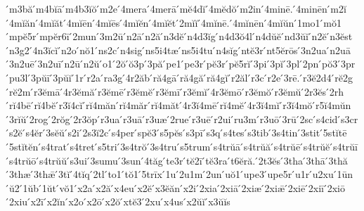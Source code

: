 {́m3bă
́m4bĭā
́m4b3ĭŏ
́m2e
́4mera
́4merā
́mĕ4dĭ
́4mĕdŏ
́m2in
́4minē.
́4minēn
́m2ĭ
́4mĭăn
́4mĭăt
́4mĭēn
́4mĭēs
́4mĭĕn
́4mĭĕt
́2mĭĭ
́4mĭnē.
́4mĭnēn
́4mĭŭn
́1mo1
́mŏ1
́mpĕ5r
́mpĕr6ī
́2mun
́3m2ū
́n2ā
́n2ă
́n3dĕ
́n4d3ĭg
́n4d3ŏ4l
́n4dŭĕ
́nd3ŭĭ
́n2ĕ
́n3ĕst
́n3g2
́4n3ĭcĭ
́n2o
́nŏ1
́ns2c
́n4sig
́ns5i4tæ
́ns5i4tu
́n4sĭg
́ntĕ3r
́nt5ĕrōs
́3n2ua
́n2uā
́3n2uē
́3n2uī
́n2ū
́n2ŭ
́o1
́2ŏ
́ŏ3p
́3pă
́pe1
́pe3r
́pĕ3r
́pĕ5rĭ
́3pi
́3pĭ
́3pl
́2pn
́pŏ3
́3pr
́pu3l
́3pŭī
́3pŭĭ
́1r
́r2a
́ra3g
́4r2ăb
́ră4gā
́ră4gă
́ră4gĭ
́r2ăl
́r3c
́r2e
́3rē.
́r3ĕ2d4
́rĕ2g
́rĕ2m
́r3ĕmā
́4r3ĕmă
́r3ĕmē
́r3ĕmĕ
́r3ĕmī
́r3ĕmĭ
́4r3ĕmō
́r3ĕmŏ
́r3ĕmŭ
́2r3ĕs
́2rh
́rĭ4bē
́rĭ4bĕ
́r3ĭ4cĭ
́rĭ4măn
́rĭ4măr
́rĭ4măt
́4r3ĭ4mē
́rĭ4mĕ
́4r3ĭ4mĭ
́r3ĭ4mŏ
́r5ĭ4mŭn
́3rĭŭ
́2rog
́2rŏg
́2r3ŏp
́r3ua
́r3uā
́r3uæ
́2rue
́r3uē
́r2ui
́ru3m
́r3uō
́3rū
́2sc
́s4cid
́s3cr
́s2ĕ
́s4ĕr
́3sĕŭ
́s2i
́2s3ĭ2c
́s4per
́spĕ3
́s5pĕs
́s3pī
́s3q
́s4tes
́s3tib
́3s4tin
́3stit
́5stĭtē
́5stĭtĕn
́s4trat
́s4tret
́s5tri
́3s4trŏ
́3s4tru
́s5trum
́s4trŭā
́s4trŭă
́s4trŭē
́s4trŭĕ
́s4trŭī
́s4trŭō
́s4trŭŭ
́s3ui
́3sumu
́3sun
́4tăg
́te3r
́tĕ2ī
́tĕ3ra
́t6ĕră.
́2t3ĕs
́3tha
́3thā
́3thă
́3thæ
́3thǣ
́3tĭ
́4tĭq
́2tl
́to1
́tŏ1
́5trīx
́1u
́2u1m
́2un
́uŏ1
́upe3
́upe5r
́u1r
́u2xu
́1ūn
́ŭ2
́1ŭb
́1ŭt
́vŏ1
́x2a
́x2ă
́x4eu
́x2ĕ
́x3ĕăn
́x2i
́2xia
́2xiā
́2xiæ
́2xiǣ
́2xiē
́2xiī
́2xiō
́2xiu
́x2ī
́x2ĭn
́x2o
́x2ō
́x2ŏ
́xtĕ3
́2xu
́x4us
́x2ŭĭ
́x3ŭĭs
}
